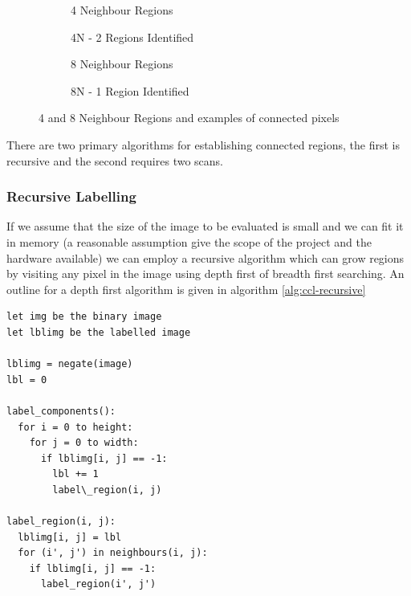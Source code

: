 \begin{figure}[h!]
    \centering
    \begin{subfigure}[b]{.4\linewidth}
        \centering
        
        \caption{4 Neighbour Regions}
        \label{fig:4-neighbour-regions}
    \end{subfigure}
    \begin{subfigure}[b]{.4\linewidth}
        \centering
        
        \caption{4N - 2 Regions Identified}
        \label{fig:4-neighbour-regions}
    \end{subfigure}
        
    \vspace*{0.5in}

    \begin{subfigure}[b]{.4\linewidth}
        \centering
        
        \label{fig:8-neighbour-regions}
        \caption{8 Neighbour Regions}
    \end{subfigure}
    \begin{subfigure}[b]{.4\linewidth}
        \centering
        
        \label{fig:8-neighbour-connected}
        \caption{8N - 1 Region Identified}
    \end{subfigure}
    
    \caption{4 and 8 Neighbour Regions and examples of connected pixels}
    \label{fig:pixel-neighbours}
\end{figure}

There are two primary algorithms for establishing connected regions, the first is recursive and the second requires two scans.

\subsubsection{Recursive Labelling}

If we assume that the size of the image to be evaluated is small and we can fit it in memory (a reasonable assumption give the scope of the project and the hardware available) we can employ a recursive algorithm which can grow regions by visiting any pixel in the image using depth first of breadth first searching. An outline for a depth first algorithm is given in algorithm \ref{alg:ccl-recursive}

\begin{lstlisting}[caption=Recursive Connected Component Labelling (DFS), label=alg:ccl-recursive]
let img be the binary image
let lblimg be the labelled image

lblimg = negate(image)
lbl = 0

label_components():
  for i = 0 to height:
    for j = 0 to width:
      if lblimg[i, j] == -1:
        lbl += 1
        label\_region(i, j)

label_region(i, j):
  lblimg[i, j] = lbl
  for (i', j') in neighbours(i, j):
    if lblimg[i, j] == -1:
      label_region(i', j')
\end{lstlisting}


